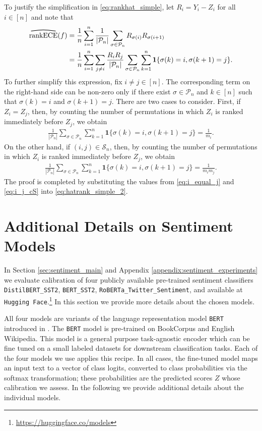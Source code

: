 \documentclass[11pt]{article}
\numberwithin{equation}{section}
\theoremstyle{definition}
\newcommand{\cP}{\mathcal{P}}
\newcommand{\cS}{\mathcal{S}}
\newcommand{\one}{\bm{1}}
\newcommand{\myoverline}[2][3.5em]{%
  \overset{%
    \tikz[baseline=-0.1ex]{
      \draw[line width=0.75pt]
        (0,0) .. controls (#1/2,0.5ex) .. (#1,0);
    }%
  }{#2}%
}
\newcommand{\rankECE}{\mathrm{rankECE}}
\newcommand{\hatrankECE}{\myoverline{\rankECE}}
\begin{document}
To justify the simplification in \eqref{eq:rankhat_simple}, let $R_i = Y_i-Z_i$ for all $i\in [n]$ and note that
\begin{align}\label{eq:hatrank_simple_2}
    \hatrankECE(f) 
    & = \frac{1}{n}\sum_{i=1}^{n}\frac{1}{|\cP_n|}\sum_{\sigma\in \cP_n}R_{\sigma(i)}R_{\sigma(i+1)}\nonumber\\
    & = \frac{1}{n}\sum_{i=1}^{n}\sum_{j\neq i}\frac{R_iR_j}{|\cP_n|}\sum_{\sigma\in \cP_n}\sum_{k=1}^{n}\one\{\sigma(k) = i, \sigma(k+1) = j\}.
\end{align}
To further simplify this expression, fix $i\neq j\in [n]$. The corresponding term on the right-hand side can be non-zero only if there exist $\sigma\in \cP_n$ and $k\in [n]$ such that $\sigma(k) = i$ and $\sigma(k+1) = j$. There are two cases to consider. First, if $Z_i = Z_j$, then, by counting the number of permutations in which $Z_i$ is ranked immediately before $Z_j$, we obtain
\begin{align}\label{eq:i_equal_j}
    \frac{1}{|\cP_n|}\sum_{\sigma\in \cP_n}\sum_{k=1}^{n}\one\{\sigma(k) = i, \sigma(k+1) = j\} = \frac{1}{m_i}.
\end{align}
On the other hand, if $(i,j)\in \cS_n$, then, by counting the number of permutations in which $Z_i$ is ranked immediately before $Z_j$, we obtain
\begin{align}\label{eq:i_j_cS}
    \frac{1}{|\cP_n|}\sum_{\sigma\in \cP_n}\sum_{k=1}^{n}\one\{\sigma(k) = i, \sigma(k+1) = j\} = \frac{1}{m_im_j}.
\end{align}
The proof is completed by substituting the values from \eqref{eq:i_equal_j} and \eqref{eq:i_j_cS} into \eqref{eq:hatrank_simple_2}.



\section{Additional Details on Sentiment Models}\label{sec:sentiment_details}

In Section \ref{sec:sentiment_main} and Appendix \ref{appendix:sentiment_experiments} we evaluate calibration of four publicly available pre-trained sentiment classifiers \texttt{DistilBERT\_SST2}, \texttt{BERT\_SST2}, \texttt{RoBERTa\_Twitter\_Sentiment}, and \texttt{} available at \texttt{Hugging Face}.\footnote{\url{https://huggingface.co/models}} In this section we provide more details about the chosen models.


All four models are variants of the language representation model \texttt{BERT} introduced in \cite{devlin2019bert}. The \texttt{BERT} model is pre-trained on BookCorpus \citep{zhu2015aligning} and English Wikipedia. This model is a general purpose task-agnostic encoder which can be fine tuned on a small labeled datasets for downstream classification tasks. Each of the four models we use applies this recipe. In all cases, the fine-tuned model maps an input text to
a vector of class logits, converted to class probabilities via the softmax
transformation; these probabilities are the predicted scores $Z$ whose
calibration we assess. In the following we provide additional details about the individual models.
\end{document}
